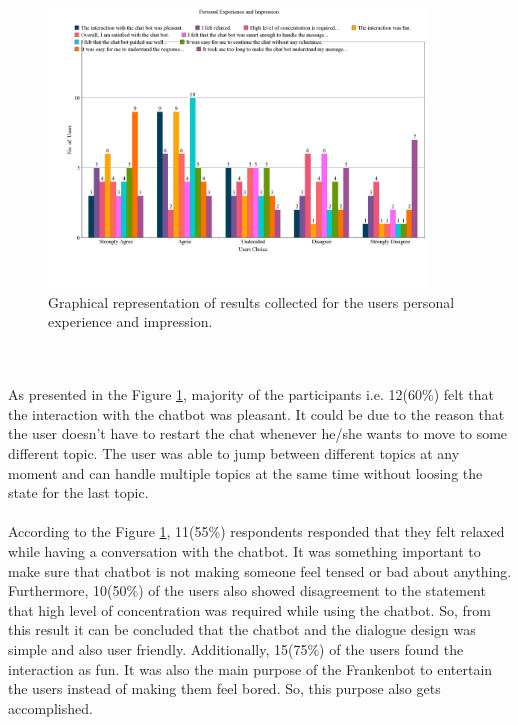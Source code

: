 \begin{figure}[!h]
    \centering
    \includegraphics[width=0.9\textwidth]{img/Personal_Experience_and_Impression_Updated.png}
    \caption{Graphical representation of results collected for the users personal experience and impression.}
    \label{fig:persExpandImp}
\end{figure}
\\~\\
As presented in the Figure \ref{fig:persExpandImp}, majority of the participants i.e. 12(60\%) felt that the interaction with the chatbot was pleasant. It could be due to the reason that the user doesn't have to restart the chat whenever he/she wants to move to some different topic. The user was able to jump between different topics at any moment and can handle multiple topics at the same time without loosing the state for the last topic. 
\\~\\
According to the Figure \ref{fig:persExpandImp}, 11(55\%) respondents responded that they felt relaxed while having a conversation with the chatbot. It was something important to make sure that chatbot is not making someone feel tensed or bad about anything. Furthermore, 10(50\%) of the users also showed disagreement to the statement that high level of concentration was required while using the chatbot. So, from this result it can be concluded that the chatbot and the dialogue design was simple and also user friendly. Additionally, 15(75\%) of the users found the interaction as fun. It was also the main purpose of the Frankenbot to entertain the users instead of making them feel bored. So, this purpose also gets accomplished. 
\\~\\
